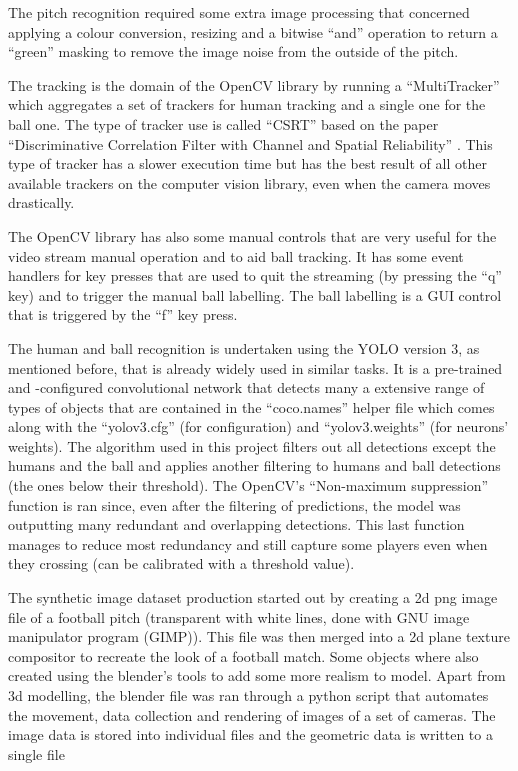 \documentclass[
11pt,
twoside
]{report}
\begin{document}
The pitch recognition required some extra image processing that concerned applying a colour conversion, resizing and a bitwise ``and'' operation to return a ``green'' masking to remove the image noise from the outside of the pitch.


The tracking is the domain of the OpenCV library by running a ``MultiTracker'' which aggregates a set of trackers for human tracking and a single one for the ball one. The type of tracker use is called ``CSRT'' based on the paper ``Discriminative Correlation Filter with Channel and Spatial Reliability'' \cite{csrt}. This type of tracker has a slower execution time but has the best result of all other available trackers on the computer vision library, even when the camera moves drastically.


The OpenCV library has also some manual controls that are very useful for the video stream manual operation and to aid ball tracking. It has some event handlers for key presses that are used to quit the streaming (by pressing the ``q'' key) and to trigger the manual ball labelling. The ball labelling is a GUI control that is triggered by the ``f'' key press.


The human and ball recognition is undertaken using the YOLO version 3, as mentioned before, that is already widely used in similar tasks. It is a pre-trained and -configured convolutional network that detects many a extensive range of types of objects that are contained in the ``coco.names'' helper file which comes along with the ``yolov3.cfg'' (for configuration) and ``yolov3.weights'' (for neurons' weights). The algorithm used in this project filters out all detections except the humans and the ball and applies another filtering to humans and ball detections (the ones below their threshold). The OpenCV's ``Non-maximum suppression'' \cite{nms} function is ran since, even after the filtering of predictions, the model was outputting many redundant and overlapping detections. This last function manages to reduce most redundancy and still capture some players even when they crossing (can be calibrated with a threshold value).


The synthetic image dataset production started out by creating a 2d png image file of a football pitch (transparent with white lines, done with GNU image manipulator program (GIMP)). This file was then merged into a 2d plane texture compositor to recreate the look of a football match. Some objects where also created using the blender's tools to add some more realism to model. Apart from 3d modelling, the blender file was ran through a python script that automates the movement, data collection and rendering of images of a set of cameras. The image data is stored into individual files and the geometric data is written to a single file
\end{document}

